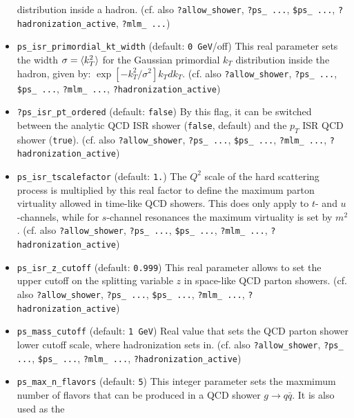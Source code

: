 \documentclass[12pt]{book}
\newcommand{\ttt}[1]{\texttt{#1}}
\begin{document}
\begin{itemize}
distribution inside a hadron.  (cf. also
\ttt{?allow\_shower}, \ttt{?ps\_   ...}, \ttt{\$ps\_ ...},
\ttt{?hadronization\_active}, \ttt{?mlm\_ ...})    
\item
\ttt{ps\_isr\_primordial\_kt\_width} \qquad (default: \ttt{0
GeV}/off) \newline
This real parameter sets the width $\sigma = \mathinner{\langle{k_T^2}\rangle}$ for the
Gaussian primordial $k_T$ distribution inside the hadron, given by:
$\exp[-k_T^2/\sigma^2] k_T dk_T$.  (cf. also
\ttt{?allow\_shower}, \ttt{?ps\_   ...}, \ttt{\$ps\_ ...}, \ttt{?mlm\_
  ...}, \ttt{?hadronization\_active})   
\item
\ttt{?ps\_isr\_pt\_ordered} \qquad (default: \ttt{false}) \newline
By this flag, it can be switched between the analytic QCD ISR shower
(\ttt{false}, default) and the $p_T$ ISR QCD shower
(\ttt{true}). (cf. also \ttt{?allow\_shower}, \ttt{?ps\_   ...},
\ttt{\$ps\_ ...}, \ttt{?mlm\_ ...}, \ttt{?hadronization\_active})   
\item
\ttt{ps\_isr\_tscalefactor} \qquad (default: \ttt{1.}) \newline
The $Q^2$ scale of the hard scattering process is multiplied by this
real factor to define the maximum parton virtuality allowed in
time-like QCD showers. This does only apply to $t$- and $u$-channels,
while for $s$-channel resonances the maximum virtuality is set by
$m^2$.  (cf. also \ttt{?allow\_shower}, \ttt{?ps\_   ...},
\ttt{\$ps\_ ...}, \ttt{?mlm\_ ...}, \ttt{?hadronization\_active})  
\item
\ttt{ps\_isr\_z\_cutoff} \qquad (default: \ttt{0.999}) \newline
This real parameter allows to set the upper cutoff on the splitting
variable $z$ in space-like QCD parton showers. (cf. also
\ttt{?allow\_shower}, \ttt{?ps\_   ...}, \ttt{\$ps\_ ...}, \ttt{?mlm\_
...}, \ttt{?hadronization\_active})    
\item
\ttt{ps\_mass\_cutoff} \qquad (default: \ttt{1 GeV}) \newline
Real value that sets the QCD parton shower lower cutoff scale, where
hadronization sets in. (cf. also \ttt{?allow\_shower}, \ttt{?ps\_
...}, \ttt{\$ps\_ ...}, \ttt{?mlm\_ ...},
\ttt{?hadronization\_active})  
\item
\ttt{ps\_max\_n\_flavors} \qquad (default: \ttt{5}) \newline
This integer parameter sets the maxmimum number of flavors that can be
produced in a QCD shower $g\to q\bar q$. It is also used as the

\end{itemize}
\end{document}

